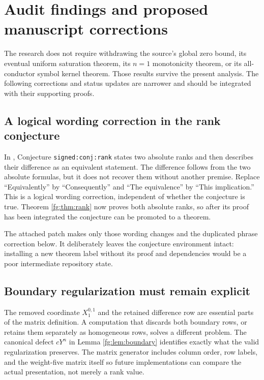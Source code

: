 \section{Audit findings and proposed manuscript corrections}
\label{audit:sec:corrections}

The research does not require withdrawing the source's global zero
bound, its eventual uniform saturation theorem, its $n=1$ monotonicity
theorem, or its all-conductor symbol kernel theorem. Those results
survive the present analysis. The following corrections and status
updates are narrower and should be integrated with their supporting
proofs.

\subsection{A logical wording correction in the rank conjecture}

In , Conjecture
\texttt{signed:conj:rank} states two absolute ranks and then describes
their difference as an equivalent statement. The difference follows
from the two absolute formulas, but it does not recover them without
another premise. Replace ``Equivalently'' by ``Consequently'' and
``The equivalence'' by ``This implication.'' This is a logical wording
correction, independent of whether the conjecture is true. Theorem
\ref{fg:thm:rank} now proves both absolute ranks, so after its proof
has been integrated the conjecture can be promoted to a theorem.

The attached patch makes only those wording changes and the duplicated
phrase correction below. It deliberately leaves the conjecture
environment intact: installing a new theorem label without its proof
and dependencies would be a poor intermediate repository state.

\subsection{Boundary regularization must remain explicit}

The removed coordinate $X_1^{0,1}$ and the retained difference row are
essential parts of the matrix definition. A computation that discards
both boundary rows, or retains them separately as homogeneous rows,
solves a different problem. The canonical defect $cY^n$ in Lemma
\ref{fg:lem:boundary} identifies exactly what the valid regularization
preserves. The matrix generator includes column order, row labels, and
the weight-five matrix itself so future implementations can compare
the actual presentation, not merely a rank value.

